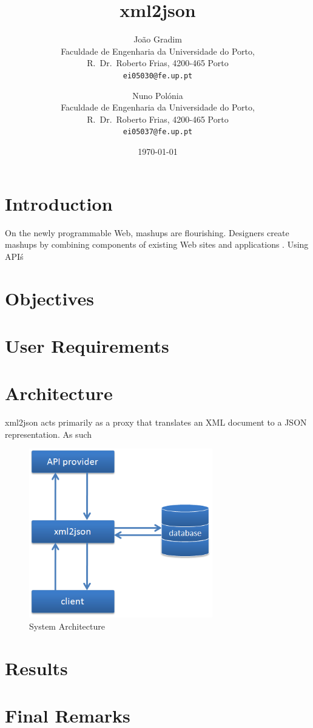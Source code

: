 \documentclass[twocolumn,twoside,10pt,a4paper]{article}
\title{xml2json}
\author{João Gradim\\
\small Faculdade de Engenharia da Universidade do Porto,\\[-0.8ex]
\small R.\ Dr.\ Roberto Frias, 4200-465 Porto\\[-0.8ex]
\small \texttt{ei05030@fe.up.pt}\\
\and
Nuno Polónia\\
\small Faculdade de Engenharia da Universidade do Porto,\\[-0.8ex]
\small R.\ Dr.\ Roberto Frias, 4200-465 Porto\\[-0.8ex]
\small \texttt{ei05037@fe.up.pt}
}
\date{\today}
\begin{document}
\maketitle
\thispagestyle{plain}

\begin{abstract}

\end{abstract}

\section{Introduction}\label{sec:intro}
On the newly programmable Web, mashups are flourishing. Designers create mashups by combining components of existing Web sites and applications \cite{maximilien}.
Using API\'s

\section{Objectives}\label{sec:objectives}

\section{User Requirements}\label{sec:user-requirements}

\section{Architecture}\label{sec:architecture}

xml2json acts primarily as a proxy that translates an XML document to a JSON representation. As such

\begin{figure}[h]
\centering
\includegraphics[width=80mm]{images/arch.png}
\caption{System Architecture}
\label{fig:system_arch}
\end{figure}

\section{Results}\label{sec:results}

\section{Final Remarks}\label{sec:final-remarks}

\renewcommand{\bibname}{References}


\end{document}
